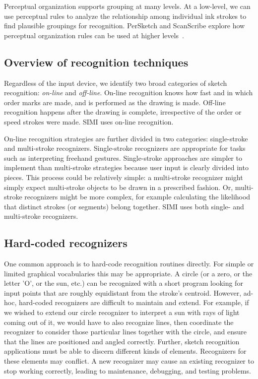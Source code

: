 

Perceptual organization supports grouping at many levels. At a
low-level, we can use perceptual rules to analyze the relationship
among individual ink strokes to find plausible groupings for
recognition. PerSketch and ScanScribe explore how perceptual
organization rules can be used at higher
levels~\cite{saund-persketch,saund-perceptual}. 

\subsection{Overview of recognition techniques}
\label{sec:recognition-techniques}

Regardless of the input device, we identify two broad categories of
sketch recognition: \textit{on-line} and \textit{off-line}. On-line
recognition knows how fast and in which order marks are made, and is
performed as the drawing is made. Off-line recognition happens after
the drawing is complete, irrespective of the order or speed strokes
were made. SIMI uses on-line recognition.

On-line recognition strategies are further divided in two categories:
single-stroke and multi-stroke recognizers. Single-stroke recognizers
are appropriate for tasks such as interpreting freehand
gestures. Single-stroke approaches are simpler to implement than
multi-stroke strategies because user input is clearly divided into
pieces. This process could be relatively simple: a multi-stroke
recognizer might simply expect multi-stroke objects to be drawn in a
prescribed fashion. Or, multi-stroke recognizers might be more
complex, for example calculating the likelihood that distinct strokes
(or segments) belong together. SIMI uses both single- and multi-stroke
recognizers.

\subsection{Hard-coded recognizers}
\label{sec:recognition-hard-coded}

One common approach is to hard-code recognition routines directly. For
simple or limited graphical vocabularies this may be appropriate. A
circle (or a zero, or the letter 'O', or the sun, etc.)  can be
recognized with a short program looking for input points that are
roughly equidistant from the stroke's centroid. However, ad-hoc,
hard-coded recognizers are difficult to maintain and extend. For
example, if we wished to extend our circle recognizer to interpret a
sun with rays of light coming out of it, we would have to also
recognize lines, then coordinate the recognizer to consider those
particular lines together with the circle, and ensure that the lines
are positioned and angled correctly. Further, sketch recognition
applications must be able to discern different kinds of
elements. Recognizers for these elements may conflict. A new
recognizer may cause an existing recognizer to stop working correctly,
leading to maintenance, debugging, and testing problems.

